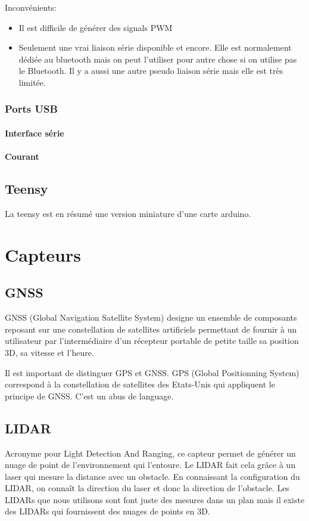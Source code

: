 \documentclass[a4paper, 11pt]{report}
\begin{document}
Inconvénients:
\begin{itemize}
\item Il est difficile de générer des signals PWM
\item Seulement une vrai liaison série disponible et encore. Elle est normalement dédiée au bluetooth mais on peut l'utiliser pour autre chose si on utilise pas le Bluetooth. Il y a aussi une autre pseudo liaison série mais elle est très limitée.
\end{itemize}

\subsection{Ports USB}

\subsubsection{Interface série}

\subsubsection{Courant}

\section{Teensy}
La teensy est en résumé une version miniature d'une carte arduino.

\chapter{Capteurs}

\section{GNSS}
GNSS (Global Navigation Satellite System)  designe un ensemble de composants reposant sur une constellation de satellites artificiels permettant de fournir à un utilisateur par l’intermédiaire d'un récepteur portable de petite taille sa position 3D, sa vitesse et l'heure.

Il est important de distinguer GPS et GNSS. GPS (Global Positionning System) correspond à la constellation de satellites des Etats-Unis qui appliquent le principe de GNSS. C'est un abus de language.

\section{LIDAR}
Acronyme pour Light Detection And Ranging, ce capteur permet de générer un nuage de point de l'environnement qui l'entoure. Le LIDAR fait cela grâce à un laser qui mesure la distance avec un obstacle. En connaissant la configuration du LIDAR, on connaît la direction du laser et donc la direction de l'obstacle. Les LIDARs que nous utilisons sont font juste des mesures dans un plan mais il existe des LIDARs qui fournissent des nuages de points en 3D.
\end{document}
